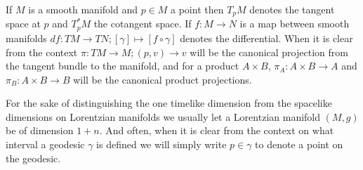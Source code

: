 If $M$ is a smooth manifold and $p\in M$ a point then $T_pM$ denotes the tangent space at $p$ and $T^*_pM$ the cotangent space. If $f:M\to N$ is a map between smooth manifolds $df:TM\to TN; [\gamma]\mapsto [f\circ\gamma]$ denotes the differential. When it is clear from the context $\pi:TM\to M; (p,v)\to v$ will be the canonical projection from the tangent bundle to the manifold, and for a product $A\times B$, $\pi_A:A\times B\to A$ and $\pi_B:A\times B\to B$ will be the canonical product projections.

For the sake of distinguishing the one timelike dimension from the spacelike dimensions on Lorentzian manifolds we usually let a Lorentzian manifold $(M,g)$ be of dimension $1+n$. And often, when it is clear from the context on what interval a geodesic $\gamma$ is defined we will simply write $p\in \gamma$ to denote a point on the geodesic.